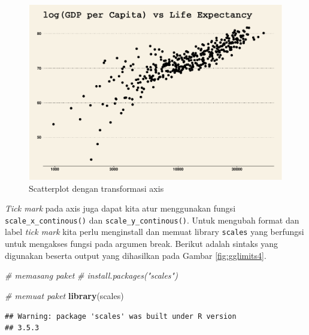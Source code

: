 \documentclass[]{book}
\newenvironment{Shaded}{\begin{snugshade}}{\end{snugshade}}
\newcommand{\KeywordTok}[1]{\textcolor[rgb]{0.13,0.29,0.53}{\textbf{#1}}}
\newcommand{\CommentTok}[1]{\textcolor[rgb]{0.56,0.35,0.01}{\textit{#1}}}
\newcommand{\NormalTok}[1]{#1}
\begin{document}
\begin{figure}

{\centering \includegraphics[width=0.7\linewidth]{EnvStat_files/figure-latex/gglimits3-1} 

}

\caption{Scatterplot dengan transformasi axis }\label{fig:gglimits3}
\end{figure}

\emph{Tick mark} pada axis juga dapat kita atur menggunakan fungsi
\texttt{scale\_x\_continous()} dan \texttt{scale\_y\_continous()}. Untuk
mengubah format dan label \emph{tick mark} kita perlu menginstall dan
memuat library \texttt{scales} yang berfungsi untuk mengakses fungsi
pada argumen break. Berikut adalah sintaks yang digunakan beserta output
yang dihasilkan pada Gambar \ref{fig:gglimits4}.

\begin{Shaded}
\begin{Highlighting}[]
\CommentTok{# memasang paket}
\CommentTok{# install.packages("scales")}

\CommentTok{# memuat paket}
\KeywordTok{library}\NormalTok{(scales)}
\end{Highlighting}
\end{Shaded}

\begin{verbatim}
## Warning: package 'scales' was built under R version
## 3.5.3
\end{verbatim}
\end{document}
